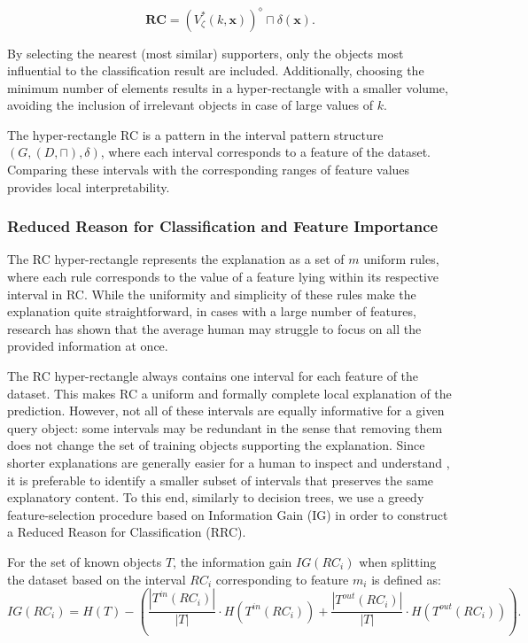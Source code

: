 \documentclass[a4paper,fleqn]{cas-sc}
\begin{document}
\begin{equation} \label{section_3:eq_r}
    \mathbf{RC} = (V_\zeta^*(k, \mathbf{x}))^\diamond \sqcap \delta(\mathbf{x}) .
\end{equation}

By selecting the nearest (most similar) supporters, only the objects most influential to the classification result are included. Additionally, choosing the minimum number of elements results in a hyper-rectangle with a smaller volume, avoiding the inclusion of irrelevant objects in case of large values of $k$.

The hyper-rectangle RC is a pattern in the interval pattern structure $(G, (D, \sqcap), \delta)$, where each interval corresponds to a feature of the dataset. Comparing these intervals with the corresponding ranges of feature values provides local interpretability.

\subsubsection{Reduced Reason for Classification and Feature Importance}
The RC hyper-rectangle represents the explanation as a set of $m$ uniform rules, where each rule corresponds to the value of a feature lying within its respective interval in RC. While the uniformity and simplicity of these rules make the explanation quite straightforward, in cases with a large number of features, research has shown that the average human may struggle to focus on all the provided information at once.


The RC hyper-rectangle always contains one interval for each feature of the dataset. This makes RC a uniform and formally complete local explanation of the prediction. However, not all of these intervals are equally informative for a given query object: some intervals may be redundant in the sense that removing them does not change the set of training objects supporting the explanation. Since shorter explanations are generally easier for a human to inspect and understand \cite{dudyrev2022human, miller1956magical}, it is preferable to identify a smaller subset of intervals that preserves the same explanatory content. To this end, similarly to decision trees, we use a greedy feature-selection procedure based on Information Gain (IG) in order to construct a Reduced Reason for Classification (RRC).


For the set of known objects $T$, the information gain $IG(RC_i)$ when splitting the dataset based on the interval $RC_i$ corresponding to feature $m_i$ is defined as:
\begin{equation}\label{eq:ig}
    IG(RC_i) = H(T) - \left(
    \frac{|T^{in}(RC_i)|}{|T|} \cdot H(T^{in}(RC_i)) +
    \frac{|T^{out}(RC_i)|}{|T|} \cdot H(T^{out}(RC_i))
    \right) .
\end{equation}
\end{document}
